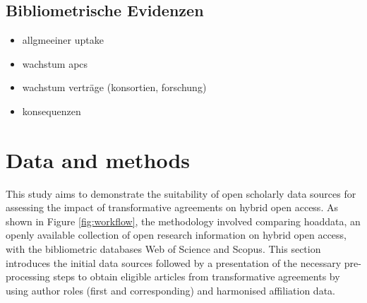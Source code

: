 \documentclass[a4paper,man,floatsintext,longtable,noextraspace,10pt]{apa6}
\providecommand{\tightlist}{%
  \setlength{\itemsep}{0pt}\setlength{\parskip}{0pt}}
\begin{document}
\subsection{Bibliometrische Evidenzen}\label{bibliometrische-evidenzen}

\begin{itemize}
\tightlist
\item
  allgmeeiner uptake
\item
  wachstum apcs
\item
  wachstum verträge (konsortien, forschung)
\item
  konsequenzen
\end{itemize}

\section{Data and methods}\label{data-and-methods}

This study aims to demonstrate the suitability of open scholarly data
sources for assessing the impact of transformative agreements on hybrid
open access. As shown in Figure \ref{fig:workflow}, the methodology
involved comparing hoaddata, an openly available collection of open
research information on hybrid open access, with the bibliometric
databases Web of Science and Scopus. This section introduces the initial
data sources followed by a presentation of the necessary pre-processing
steps to obtain eligible articles from transformative agreements by
using author roles (first and corresponding) and harmonised affiliation
data.
\end{document}
